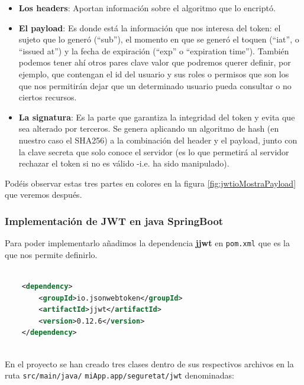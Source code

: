 \documentclass[a4paper,12pt]{report}
\begin{document}
				\begin{itemize}
					\setlength{\itemsep}{-.5em}
					\item 				\textbf{Los headers}: Aportan información sobre el algoritmo que lo encriptó.
					\item 				\textbf{El payload}: Es donde está la información que nos interesa del token: el sujeto que lo generó (``sub''), el momento en que se generó el toquen (``iat'', o ``issued at'') y la fecha de expiración (``exp'' o ``expiration time''). También podemos tener ahí otros pares clave valor que podremos querer definir, por ejemplo, que contengan el id del usuario y sus roles o permisos que son los que nos permitirán dejar que un determinado usuario pueda consultar o no ciertos recursos.
					
					\item \textbf{La signatura}: Es la parte que garantiza la integridad del token y evita que sea alterado por terceros. Se genera aplicando un algoritmo de hash (en nuestro caso el SHA256) a la combinación del header y el payload, junto con la clave secreta que solo conoce el servidor (es lo que permetirá al servidor rechazar el token si no es válido -i.e. ha sido manipulado).
				\end{itemize}
				
				Podéis observar estas tres partes en colores en la figura \ref{fig:jwtioMostraPayload} que veremos después.
				
				
				

				

				
				
				\subsubsection{Implementación de JWT en java SpringBoot}
				\label{sec:implementacionJWTjava}
				Para poder implementarlo añadimos la dependencia \textbf{jjwt} en \texttt{pom.xml} que es la que nos permite definirlo.
				
				
				\begin{lstlisting}[language=XML, basicstyle=\ttfamily\small, keywordstyle=\color{red}]
					
	<dependency>
		<groupId>io.jsonwebtoken</groupId>
		<artifactId>jjwt</artifactId>
		<version>0.12.6</version>
	</dependency>
					
				\end{lstlisting}
				
				
		En el proyecto se han creado tres clases dentro de sus respectivos archivos en la ruta \texttt{src/main/java/} \texttt{miApp.app/seguretat/jwt} denominadas:
		
\end{document}
